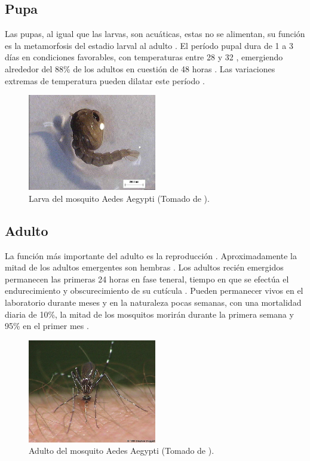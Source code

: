 \subsection{Pupa}
\label{subsec:ciclo-biologico-pupa}
Las pupas, al igual que las larvas, son acuáticas, estas no se alimentan, su función es la
metamorfosis del estadio larval al adulto \cite{ThironIzcazaJ2003}. El período pupal dura de 1
a 3 días en condiciones favorables, con temperaturas entre 28 y 32 \textcelsius
\cite{web-site:gMonteroBiologia}, emergiendo alrededor del 88\% de los adultos en cuestión de 48
horas \cite{ThironIzcazaJ2003}. Las variaciones extremas de temperatura pueden dilatar este período
\cite{web-site:gMonteroBiologia}.

\begin{figure}[H]
\centering
\includegraphics[width=0.5\textwidth]{capitulo-3/graphics/pupa.png}
\caption{\label{fig:cap3-larvas} Larva del mosquito Aedes Aegypti (Tomado de
\cite{sivanathan2006ecology}).}
\end{figure}

\subsection{Adulto}
\label{subsec:ciclo-biologico-adulto}
La función más importante del adulto es la reproducción \cite{ThironIzcazaJ2003}. Aproximadamente
la mitad de los adultos emergentes son hembras \cite{otero2006stochastic, manrique1998desarrollo}.
Los adultos recién emergidos permanecen las primeras 24 horas en fase teneral, tiempo en que se
efectúa el endurecimiento y obscurecimiento de su cutícula \cite{luevano1993ciclo}. Pueden
permanecer vivos en el laboratorio durante meses y en la naturaleza pocas semanas, con una
mortalidad diaria de 10\%, la mitad de los mosquitos morirán durante la primera semana y 95\% en
el primer mes \cite{ThironIzcazaJ2003}.

\begin{figure}[H]
\centering
\includegraphics[width=0.5\textwidth]{capitulo-3/graphics/adulto.png}
\caption{\label{fig:cap3-larvas} Adulto del mosquito Aedes Aegypti (Tomado de
\cite{directricesDetvArg}).}
\end{figure}

